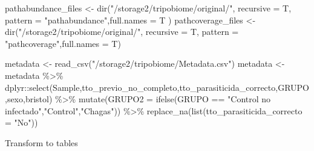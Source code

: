 \documentclass[
  letterpaper,
  DIV=11,
  numbers=noendperiod]{scrartcl}
\newenvironment{Shaded}{\begin{snugshade}}{\end{snugshade}}
\newcommand{\AttributeTok}[1]{\textcolor[rgb]{0.40,0.45,0.13}{#1}}
\newcommand{\FunctionTok}[1]{\textcolor[rgb]{0.28,0.35,0.67}{#1}}
\newcommand{\NormalTok}[1]{\textcolor[rgb]{0.00,0.23,0.31}{#1}}
\newcommand{\OtherTok}[1]{\textcolor[rgb]{0.00,0.23,0.31}{#1}}
\newcommand{\SpecialCharTok}[1]{\textcolor[rgb]{0.37,0.37,0.37}{#1}}
\newcommand{\StringTok}[1]{\textcolor[rgb]{0.13,0.47,0.30}{#1}}
\begin{document}
\begin{Shaded}
\begin{Highlighting}[]
\NormalTok{pathabundance\_files }\OtherTok{\textless{}{-}} \FunctionTok{dir}\NormalTok{(}\StringTok{"/storage2/tripobiome/original/"}\NormalTok{, }\AttributeTok{recursive =}\NormalTok{ T, }\AttributeTok{pattern =} \StringTok{"pathabundance"}\NormalTok{,}\AttributeTok{full.names =}\NormalTok{ T )}
\NormalTok{pathcoverage\_files }\OtherTok{\textless{}{-}} \FunctionTok{dir}\NormalTok{(}\StringTok{"/storage2/tripobiome/original/"}\NormalTok{, }\AttributeTok{recursive =}\NormalTok{ T, }\AttributeTok{pattern =} \StringTok{"pathcoverage"}\NormalTok{,}\AttributeTok{full.names =}\NormalTok{ T)}



\NormalTok{metadata }\OtherTok{\textless{}{-}} \FunctionTok{read\_csv}\NormalTok{(}\StringTok{"/storage2/tripobiome/Metadata.csv"}\NormalTok{)}
\NormalTok{metadata }\OtherTok{\textless{}{-}}\NormalTok{ metadata }\SpecialCharTok{\%\textgreater{}\%}\NormalTok{ dplyr}\SpecialCharTok{::}\FunctionTok{select}\NormalTok{(Sample,tto\_previo\_no\_completo,tto\_parasiticida\_correcto,GRUPO,sexo,bristol) }\SpecialCharTok{\%\textgreater{}\%} 
  \FunctionTok{mutate}\NormalTok{(}\AttributeTok{GRUPO2 =} \FunctionTok{ifelse}\NormalTok{(GRUPO }\SpecialCharTok{==} \StringTok{"Control no infectado"}\NormalTok{,}\StringTok{"Control"}\NormalTok{,}\StringTok{"Chagas"}\NormalTok{)) }\SpecialCharTok{\%\textgreater{}\%} 
  \FunctionTok{replace\_na}\NormalTok{(}\FunctionTok{list}\NormalTok{(}\AttributeTok{tto\_parasiticida\_correcto =} \StringTok{"No"}\NormalTok{)) }
\end{Highlighting}
\end{Shaded}

Transform to tables
\end{document}
